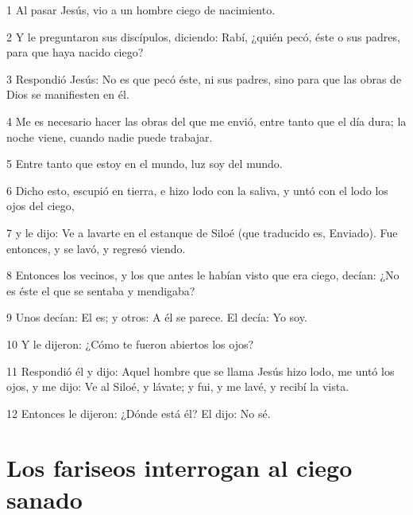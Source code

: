 \par 1 Al pasar Jesús, vio a un hombre ciego de nacimiento.
\par 2 Y le preguntaron sus discípulos, diciendo: Rabí, ¿quién pecó, éste o sus padres, para que haya nacido ciego?
\par 3 Respondió Jesús: No es que pecó éste, ni sus padres, sino para que las obras de Dios se manifiesten en él.
\par 4 Me es necesario hacer las obras del que me envió, entre tanto que el día dura; la noche viene, cuando nadie puede trabajar.
\par 5 Entre tanto que estoy en el mundo, luz soy del mundo.
\par 6 Dicho esto, escupió en tierra, e hizo lodo con la saliva, y untó con el lodo los ojos del ciego,
\par 7 y le dijo: Ve a lavarte en el estanque de Siloé (que traducido es, Enviado). Fue entonces, y se lavó, y regresó viendo.
\par 8 Entonces los vecinos, y los que antes le habían visto que era ciego, decían: ¿No es éste el que se sentaba y mendigaba?
\par 9 Unos decían: El es; y otros: A él se parece. El decía: Yo soy.
\par 10 Y le dijeron: ¿Cómo te fueron abiertos los ojos?
\par 11 Respondió él y dijo: Aquel hombre que se llama Jesús hizo lodo, me untó los ojos, y me dijo: Ve al Siloé, y lávate; y fui, y me lavé, y recibí la vista.
\par 12 Entonces le dijeron: ¿Dónde está él? El dijo: No sé.

\section*{Los fariseos interrogan al ciego sanado}


